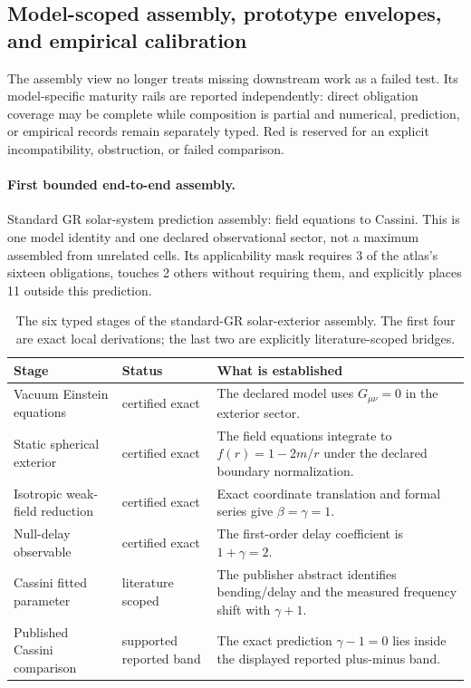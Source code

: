 \subsection{Model-scoped assembly, prototype envelopes, and empirical calibration}
\label{app:assembly-calibration}
The assembly view no longer treats missing downstream work as a failed test.  Its model-specific maturity rails are reported independently: direct obligation coverage may be complete while composition is partial and numerical, prediction, or empirical records remain separately typed.  Red is reserved for an explicit incompatibility, obstruction, or failed comparison.

\paragraph{First bounded end-to-end assembly.}
Standard GR solar-system prediction assembly: field equations to Cassini.  This is one model identity and one declared observational sector, not a maximum assembled from unrelated cells.  Its applicability mask requires 3 of the atlas's sixteen obligations, touches 2 others without requiring them, and explicitly places 11 outside this prediction.

\begin{table}[htbp]
\centering
\scriptsize
\begin{tabularx}{\textwidth}{@{}p{}p{}Y@{}}
\toprule
Stage & Status & What is established \\
\midrule
Vacuum Einstein equations & certified exact & The declared model uses \(G_{\mu\nu}=0\) in the exterior sector. \\
Static spherical exterior & certified exact & The field equations integrate to \(f(r)=1-2m/r\) under the declared boundary normalization. \\
Isotropic weak-field reduction & certified exact & Exact coordinate translation and formal series give \(\beta=\gamma=1\). \\
Null-delay observable & certified exact & The first-order delay coefficient is \(1+\gamma=2\). \\
Cassini fitted parameter & literature scoped & The publisher abstract identifies bending/delay and the measured frequency shift with \(\gamma+1\). \\
Published Cassini comparison & supported reported band & The exact prediction \(\gamma-1=0\) lies inside the displayed reported plus-minus band. \\
\bottomrule
\end{tabularx}
\caption{The six typed stages of the standard-GR solar-exterior assembly.  The first four are exact local derivations; the last two are explicitly literature-scoped bridges.}
\label{tab:gr-cassini-assembly}
\end{table}


